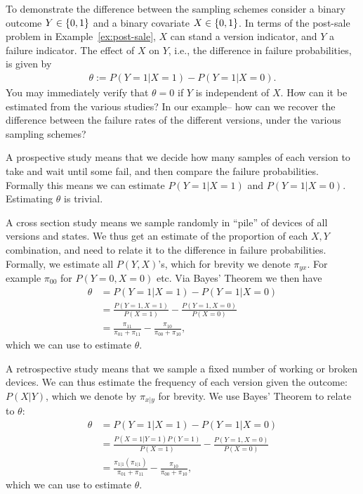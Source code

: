 To demonstrate the difference between the sampling schemes consider a binary outcome $Y\in\{ 0,1 \}$ and a binary covariate $X\in\{ 0,1 \}$. 
In terms of the post-sale problem in Example~\ref{ex:post-sale}, $X$ can stand a version indicator, and $Y$ a failure indicator. 
The effect of $X$ on $Y$, i.e., the difference in failure probabilities, is given by
\begin{align}
	\theta:= P(Y=1|X=1)-P(Y=1|X=0).
\end{align}
You may immediately verify that $\theta=0$ if $Y$ is independent of $X$. 
How can it be estimated from the various studies?
In our example-- how can we recover the difference between the failure rates of the different versions, under the various sampling schemes?

A prospective study means that we decide how many samples of each version to take and wait until some fail, and then compare the failure probabilities. 
Formally this means we can estimate $P(Y=1|X=1)$ and $P(Y=1|X=0)$.
Estimating $\theta$ is trivial. 

A cross section study means we sample randomly in ``pile'' of devices of all versions and states. 
We thus get an estimate of the proportion of each $X,Y$ combination, and need to relate it to the difference in failure probabilities. 
Formally, we estimate all $P(Y,X)$'s, which for brevity we denote $\pi_{yx}$.
For example $\pi_{00}$ for $P(Y=0,X=0)$ etc. 
Via Bayes' Theorem we then have 
\begin{align*}
	\theta 
	&= P(Y=1|X=1) - P(Y=1|X=0) \\
	&= \frac{P(Y=1,X=1)}{P(X=1)} - \frac{P(Y=1,X=0)}{P(X=0)} \\
	&= \frac{\pi_{11}}{\pi_{01}+\pi_{11}}-\frac{\pi_{10}}{\pi_{00}+\pi_{10}},
\end{align*}
which we can use to estimate $\theta$. 

A retrospective study means that we sample a fixed number of working or broken devices. 
We can thus estimate the frequency of each version given the outcome: $P(X|Y)$, which we denote by $\pi_{x|y}$ for brevity.
We use Bayes' Theorem to relate to $\theta$:
\begin{align*}
	\theta
	&= P(Y=1|X=1) - P(Y=1|X=0) \\
	&= \frac{P(X=1|Y=1)P(Y=1)}{P(X=1)} - \frac{P(Y=1,X=0)}{P(X=0)} \\
	&= \frac{\pi_{1|1}(\pi_{1|1})}{\pi_{01}+\pi_{11}}-\frac{\pi_{10}}{\pi_{00}+\pi_{10}},
	\end{align*}
which we can use to estimate $\theta$. 






